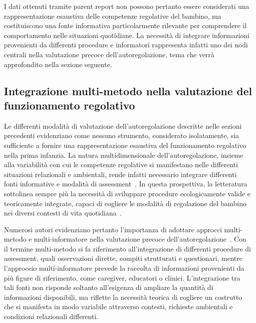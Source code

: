             I dati ottenuti tramite parent report non possono pertanto essere considerati una rappresentazione esaustiva delle competenze regolative del bambino, ma costituiscono una fonte informativa particolarmente rilevante per comprendere il comportamento nelle situazioni quotidiane. La necessità di integrare informazioni provenienti da differenti procedure e informatori rappresenta infatti uno dei nodi centrali nella valutazione precoce dell'autoregolazione, tema che verrà approfondito nella sezione seguente.

        \subsection{Integrazione multi-metodo nella valutazione del funzionamento regolativo}
        \label{sec:3_5_3}

            Le differenti modalità di valutazione dell'autoregolazione descritte nelle sezioni precedenti evidenziano come nessuno strumento, considerato isolatamente, sia sufficiente a fornire una rappresentazione esaustiva del funzionamento regolativo nella prima infanzia. La natura multidimensionale dell'autoregolazione, insieme alla variabilità con cui le competenze regolative si manifestano nelle differenti situazioni relazionali e ambientali, rende infatti necessario integrare differenti fonti informative e modalità di assessment~\cite{snyder2021}. In questa prospettiva, la letteratura sottolinea sempre più la necessità di sviluppare procedure ecologicamente valide e teoricamente integrate, capaci di cogliere le modalità di regolazione del bambino nei diversi contesti di vita quotidiana~\cite{mcclelland2012}.

            Numerosi autori evidenziano pertanto l'importanza di adottare approcci multi-metodo e multi-informatore nella valutazione precoce dell'autoregolazione~\cite{toplak2013,snyder2021}. Con il termine multi-metodo si fa riferimento all'integrazione di differenti procedure di assessment, quali osservazioni dirette, compiti strutturati e questionari, mentre l'approccio multi-informatore prevede la raccolta di informazioni provenienti da più figure di riferimento, come caregiver, educatori o clinici. L'integrazione tra tali fonti non risponde soltanto all'esigenza di ampliare la quantità di informazioni disponibili, ma riflette la necessità teorica di cogliere un costrutto che si manifesta in modo variabile attraverso contesti, richieste ambientali e condizioni relazionali differenti.

